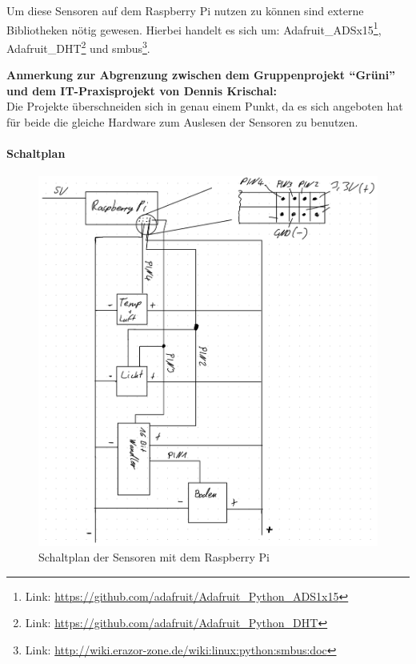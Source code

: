 Um diese Sensoren auf dem Raspberry Pi nutzen zu können sind externe
Bibliotheken nötig gewesen. Hierbei handelt es sich um:
Adafruit\_ADSx15\footnote{Link:
  \url{https://github.com/adafruit/Adafruit_Python_ADS1x15}},
Adafruit\_DHT\footnote{Link:
  \url{https://github.com/adafruit/Adafruit_Python_DHT}} und
smbus\footnote{Link:
  \url{http://wiki.erazor-zone.de/wiki:linux:python:smbus:doc}}.

\textbf{Anmerkung zur Abgrenzung zwischen dem Gruppenprojekt ``Grüni''
und dem IT-Praxisprojekt von Dennis Krischal:}\\
Die Projekte überschneiden sich in genau einem Punkt, da es sich
angeboten hat für beide die gleiche Hardware zum Auslesen der Sensoren
zu benutzen.

\hypertarget{schaltplan}{%
\paragraph{Schaltplan}\label{schaltplan}}

\begin{figure}
\centering
\includegraphics{img/schaltplan.png}
\caption{Schaltplan der Sensoren mit dem Raspberry Pi}
\end{figure}

